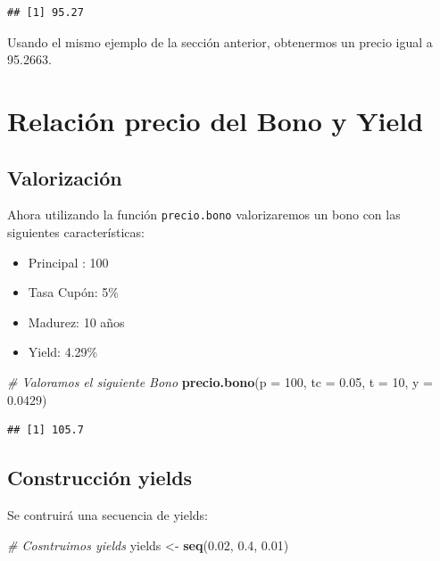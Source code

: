 \documentclass[12pt,]{book}
\newenvironment{Shaded}{\begin{snugshade}}{\end{snugshade}}
\newcommand{\KeywordTok}[1]{\textcolor[rgb]{0.13,0.29,0.53}{\textbf{#1}}}
\newcommand{\DataTypeTok}[1]{\textcolor[rgb]{0.13,0.29,0.53}{#1}}
\newcommand{\DecValTok}[1]{\textcolor[rgb]{0.00,0.00,0.81}{#1}}
\newcommand{\FloatTok}[1]{\textcolor[rgb]{0.00,0.00,0.81}{#1}}
\newcommand{\StringTok}[1]{\textcolor[rgb]{0.31,0.60,0.02}{#1}}
\newcommand{\CommentTok}[1]{\textcolor[rgb]{0.56,0.35,0.01}{\textit{#1}}}
\newcommand{\NormalTok}[1]{#1}
\providecommand{\tightlist}{%
  \setlength{\itemsep}{0pt}\setlength{\parskip}{0pt}}
\begin{document}
\begin{verbatim}
## [1] 95.27
\end{verbatim}

Usando el mismo ejemplo de la sección anterior, obtenermos un precio
igual a 95.2663.

\section{Relación precio del Bono y
Yield}\label{relacion-precio-del-bono-y-yield}

\subsection{Valorización}\label{valorizacion}

Ahora utilizando la función \texttt{precio.bono} valorizaremos un bono
con las siguientes características:

\begin{itemize}
\tightlist
\item
  Principal : 100
\item
  Tasa Cupón: 5\%
\item
  Madurez: 10 años
\item
  Yield: 4.29\%
\end{itemize}

\begin{Shaded}
\begin{Highlighting}[]
\CommentTok{# Valoramos el siguiente Bono}
\KeywordTok{precio.bono}\NormalTok{(}\DataTypeTok{p =} \DecValTok{100}\NormalTok{, }\DataTypeTok{tc =} \FloatTok{0.05}\NormalTok{, }\DataTypeTok{t =} \DecValTok{10}\NormalTok{, }\DataTypeTok{y =} \FloatTok{0.0429}\NormalTok{)}
\end{Highlighting}
\end{Shaded}

\begin{verbatim}
## [1] 105.7
\end{verbatim}

\subsection{Construcción yields}\label{construccion-yields}

Se contruirá una secuencia de yields:

\begin{Shaded}
\begin{Highlighting}[]
\CommentTok{# Cosntruimos yields }
\NormalTok{yields <-}\StringTok{ }\KeywordTok{seq}\NormalTok{(}\FloatTok{0.02}\NormalTok{, }\FloatTok{0.4}\NormalTok{, }\FloatTok{0.01}\NormalTok{)}
\end{Highlighting}
\end{Shaded}
\end{document}

